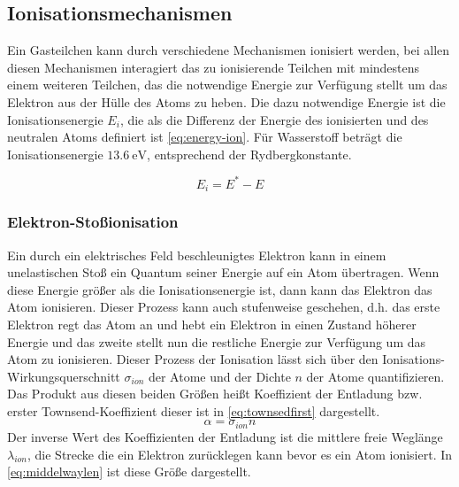 \subsection{Ionisationsmechanismen}
Ein Gasteilchen kann durch verschiedene Mechanismen ionisiert werden, bei allen diesen Mechanismen interagiert das zu ionisierende Teilchen mit mindestens einem weiteren Teilchen, das die notwendige Energie zur Verfügung stellt um das Elektron aus der Hülle des Atoms zu heben. Die dazu notwendige Energie ist die Ionisationsenergie \(E_i\), die als die Differenz der Energie des ionisierten und des neutralen Atoms definiert ist \eqref{eq:energy-ion}. Für Wasserstoff beträgt die Ionisationsenergie \(\SI{13,6}{\electronvolt}\), entsprechend der Rydbergkonstante.

\begin{equation}
    E_{i} = E^{*} - E
    \label{eq:energy-ion}
\end{equation}

\subsubsection{Elektron-Stoßionisation}
Ein durch ein elektrisches Feld beschleunigtes Elektron kann in einem unelastischen Stoß ein Quantum seiner Energie auf ein Atom übertragen. Wenn diese Energie größer als die Ionisationsenergie ist, dann kann das Elektron das Atom ionisieren. Dieser Prozess kann auch stufenweise geschehen, d.h. das erste Elektron regt das Atom an und hebt ein Elektron in einen Zustand höherer Energie und das zweite stellt nun die restliche Energie zur Verfügung um das Atom zu ionisieren. Dieser Prozess der Ionisation lässt sich über den Ionisations-Wirkungsquerschnitt \(\sigma_{ion}\) der Atome und der Dichte \(n\) der Atome quantifizieren. Das Produkt aus diesen beiden Größen heißt Koeffizient der Entladung bzw. erster Townsend-Koeffizient dieser ist in \eqref{eq:townsedfirst} dargestellt.
\begin{equation}
    \alpha = \sigma_{ion} n
    \label{eq:townsedfirst}
\end{equation}
Der inverse Wert des Koeffizienten der Entladung ist die mittlere freie Weglänge \(\lambda_{ion}\), die Strecke die ein Elektron zurücklegen kann bevor es ein Atom ionisiert. In \eqref{eq:middelwaylen} ist diese Größe dargestellt.

